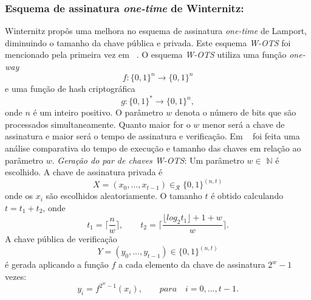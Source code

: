 \documentclass{SBCbookchapter}
\begin{document}
\begin{otherlanguage}{brazilian}
\subsubsection{Esquema de assinatura \textit{one-time} de Winternitz:}

Winternitz propôs uma melhora no esquema de assinatura \textit{one-time} de Lamport, diminuindo o tamanho da chave pública e privada. 
Este esquema \textit{W-OTS} foi mencionado pela primeira vez em ~\cite{merkle:87}.
O esquema \textit{W-OTS} utiliza uma função \textit{one-way} 
$$f:\{0,1\}^{n}  \to \{0, 1\}^{n} $$
e uma função de hash criptográfica 
$$g:\{0, 1\}^*  \to \{0, 1\}^n,$$ onde $n$ é um inteiro positivo.
O parâmetro $w$ denota o número de bits que são processados simultaneamente.  Quanto maior for o $w$ menor será a chave de assinatura e maior será o tempo de assinatura e verificação. 
Em ~\cite{dods:05} foi feita uma análise comparativa do tempo de execução e tamanho das chaves em relação ao parâmetro $w$.
\newline \newline \textit{Geração do par de chaves {W-OTS}}: Um parâmetro $w \in$ $\mathbb{N}$ é escolhido.  A chave de assinatura privada é 
$$ X=(x_0, ..., x_{t-1}) \in_\mathcal{R} \{0,1\}^{(n,t)}$$
onde os $x_i$ são escolhidos aleatoriamente. 
O tamanho $t$ é obtido calculando $t=t_1+t_2$, onde 
$$ t_1= \Bigg \lceil \frac {n}{w}\Bigg\rceil,   \qquad t_2=\Bigg\lceil \dfrac{\lfloor log_2 t_1 \rfloor +1+w}{w}\Bigg\rceil .$$
A chave pública de verificação 
$$ Y=(y_0,...,y_{t-1})  \in \{0,1\}^{(n,t)}$$
é gerada aplicando a função $f$ a cada elemento da chave de assinatura $2^w-1$ vezes:  
$$ y_i=f^{2^{w}-1} (x_i),  \qquad para \quad i=0,...,t-1. $$


\end{otherlanguage}
\end{document}
